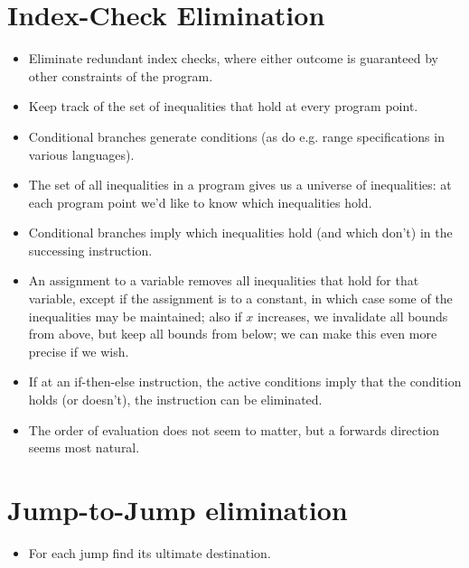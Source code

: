 \section{Index-Check Elimination}

\begin{itemize}

\item Eliminate redundant index checks, where either outcome is guaranteed by
other constraints of the program.

\item Keep track of the set of inequalities that hold at every program point.

\item Conditional branches generate conditions (as do e.g. range specifications
in various languages).

\item The set of all inequalities in a program gives us a universe of
inequalities: at each program point we'd like to know which inequalities hold.

\item Conditional branches imply which inequalities hold (and which don't) in
the successing instruction.

\item An assignment to a variable removes all inequalities that hold for that
variable, except if the assignment is to a constant, in which case some of the
inequalities may be maintained; also if $x$ increases, we invalidate all bounds
from above, but keep all bounds from below; we can make this even more precise
if we wish.

\item If at an if-then-else instruction, the active conditions imply that the
condition holds (or doesn't), the instruction can be eliminated.

\item The order of evaluation does not seem to matter, but a forwards direction
seems most natural.

\end{itemize}

\section{Jump-to-Jump elimination}

\begin{itemize}

\item For each jump find its ultimate destination.

\end{itemize}

